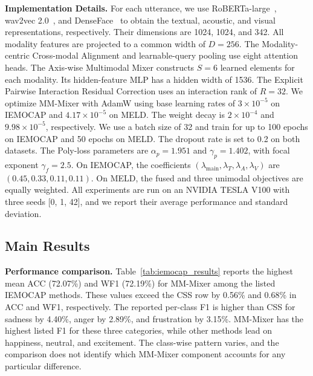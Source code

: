 \documentclass[letterpaper]{article} %
\begin{document}
\noindent\textbf{Implementation Details.}
For each utterance, we use RoBERTa-large~\cite{liu2019roberta},
wav2vec 2.0~\cite{baevski2020wav2vec}, and
DenseFace~\cite{zhao2018emotion} to obtain the textual, acoustic, and
visual representations, respectively. Their dimensions are 1024,
1024, and 342. %
All modality features are projected to a common width of $D=256$.
The Modality-centric Cross-modal Alignment and learnable-query pooling
use eight attention heads. The Axis-wise Multimodal Mixer constructs
$S=6$ learned elements for each modality. Its hidden-feature MLP has a
hidden width of 1536. The Explicit Pairwise
Interaction Residual Correction uses an interaction rank of $R=32$.
We optimize MM-Mixer with AdamW using base learning rates of
$3\times10^{-5}$ on IEMOCAP and $4.17\times10^{-5}$ on MELD. The
weight decay is $2\times10^{-4}$ and $9.98\times10^{-5}$,
respectively. We use a batch size of 32 and train for up to 100 epochs
on IEMOCAP and 50 epochs on MELD. The dropout rate is set to 0.2 on
both datasets. The Poly-loss parameters are
$\alpha_p=1.951$ and $\gamma_p=1.402$, with focal exponent
$\gamma_f=2.5$. On IEMOCAP, the coefficients
$(\lambda_{\mathrm{main}},\lambda_T,\lambda_A,\lambda_V)$ are
$(0.45,0.33,0.11,0.11)$. On MELD, the fused and three unimodal
objectives are equally weighted. All experiments are run on an NVIDIA TESLA V100 with three seeds [0, 1, 42], and we report their average performance and standard deviation.

\subsection{Main Results}
\noindent\textbf{Performance comparison.}
Table~\ref{tab:iemocap_results} reports the highest mean ACC (72.07\%) and WF1 (72.19\%) for MM-Mixer among the listed IEMOCAP methods. These values exceed the CSS row by 0.56\% and 0.68\% in ACC and WF1, respectively. The reported per-class F1 is higher than CSS for sadness by 4.40\%, anger by 2.89\%, and frustration by 3.15\%. MM-Mixer has the highest listed F1 for these three categories, while other methods lead on happiness, neutral, and excitement. The class-wise pattern varies, and the comparison does not identify which MM-Mixer component accounts for any particular difference.
\end{document}
